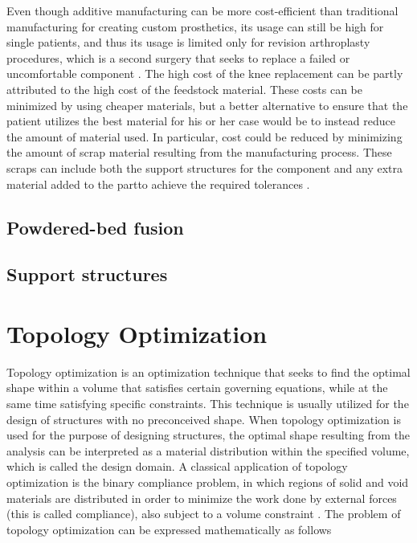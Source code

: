 \documentclass[../main.tex]{subfiles}
\begin{document}
Even though additive manufacturing can be more cost-efficient than traditional manufacturing for creating custom prosthetics, its usage can still be high for single patients, and thus its usage is limited only for revision arthroplasty procedures, which is a second surgery that seeks to replace a failed or uncomfortable component \cite{narraAdditiveManufacturingTotal2019}. The high cost of the knee replacement can be partly attributed to the high cost of the feedstock material. These costs can be minimized by using cheaper materials, but a better alternative to ensure that the patient utilizes the best material for his or her case would be to instead reduce the amount of material used. In particular, cost could be reduced by minimizing the amount of scrap material resulting from the manufacturing process. These scraps can include both the support structures for the component and any extra material added to the partto achieve the required tolerances \cite{MetalAdditiveManufacturing}.

\subsection{Powdered-bed fusion}

\subsection{Support structures}

\section{Topology Optimization}

Topology optimization is an optimization technique that seeks to find the optimal shape within a volume that satisfies certain governing equations, while at the same time satisfying specific constraints. This technique is usually utilized for the design of structures with no preconceived shape. When topology optimization is used for the purpose of designing structures, the optimal shape resulting from the analysis can be interpreted as a material distribution within the specified volume, which is called the design domain. A classical application of topology optimization is the binary compliance problem, in which regions of solid and void materials are distributed in order to minimize the work done by external forces (this is called compliance), also subject to a volume constraint \cite{liuEfficient3DTopology2014}. The problem of topology optimization can be expressed mathematically as follows \cite{lazarovFiltersTopologyOptimization2011}
\end{document}
